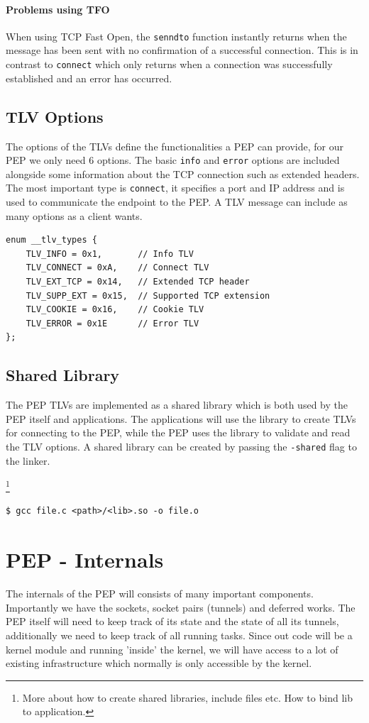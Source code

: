 \documentclass[a4paper,english, 11pt]{report}
\begin{document}
\paragraph{Problems using TFO}
When using TCP Fast Open, the \verb|senndto| function instantly returns when the message has been sent with no confirmation of a successful connection. This is in contrast to \verb|connect| which only returns when a connection was successfully established and an error has occurred.

\subsection{TLV Options}
The options of the TLVs define the functionalities a PEP can provide, for our PEP we only need 6 options. The basic \verb|info| and \verb|error| options are included alongside some information about the TCP connection such as extended headers. The most important type is \verb|connect|, it specifies a port and IP address and is used to communicate the endpoint to the PEP. A TLV message can include as many options as a client wants.

\begin{verbatim}
enum __tlv_types {
    TLV_INFO = 0x1,    	  // Info TLV
    TLV_CONNECT = 0xA,    // Connect TLV          
    TLV_EXT_TCP = 0x14,   // Extended TCP header
    TLV_SUPP_EXT = 0x15,  // Supported TCP extension
    TLV_COOKIE = 0x16,    // Cookie TLV
    TLV_ERROR = 0x1E      // Error TLV
};
\end{verbatim}

\subsection{Shared Library}
The PEP TLVs are implemented as a shared library which is both used by the PEP itself and applications. The applications will use the library to create TLVs for connecting to the PEP, while the PEP uses the library to validate and read the TLV options. 
A shared library can be created by passing the \verb|-shared| flag to the linker.

\footnote{More about how to create shared libraries, include files etc. How to bind lib to application.}

\begin{verbatim}
$ gcc file.c <path>/<lib>.so -o file.o
\end{verbatim}

\section{PEP - Internals}
The internals of the PEP will consists of many important components. Importantly we have the sockets, socket pairs (tunnels) and deferred works. The PEP itself will need to keep track of its state and the state of all its tunnels, additionally we need to keep track of all running tasks. Since out code will be a kernel module and running 'inside' the kernel, we will have access to a lot of existing infrastructure which normally is only accessible by the kernel. 
\end{document}
